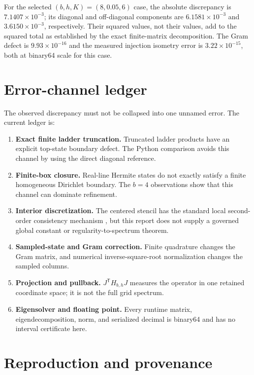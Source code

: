 \documentclass[11pt]{article}
\begin{document}
For the selected $(b,h,K)=(8,0.05,6)$ case, the absolute discrepancy is
$7.1407\times10^{-3}$; its diagonal and off-diagonal components are
$6.1581\times10^{-3}$ and $3.6150\times10^{-3}$, respectively.  Their squared values,
not their values, add to the squared total as established by the exact finite-matrix
decomposition.  The Gram defect is $9.93\times10^{-16}$ and the measured injection
isometry error is $3.22\times10^{-15}$, both at binary64 scale for this case.

\section{Error-channel ledger}

The observed discrepancy must not be collapsed into one unnamed error.  The current
ledger is:
\begin{enumerate}
\item \textbf{Exact finite ladder truncation.} Truncated ladder products have an
explicit top-state boundary defect.  The Python comparison avoids this channel by
using the direct diagonal reference.
\item \textbf{Finite-box closure.} Real-line Hermite states do not exactly satisfy a
finite homogeneous Dirichlet boundary.  The $b=4$ observations show that this channel
can dominate refinement.
\item \textbf{Interior discretization.} The centered stencil has the standard local
second-order consistency mechanism \cite{strikwerda2004}, but this report does not
supply a governed global
constant or regularity-to-spectrum theorem.
\item \textbf{Sampled-state and Gram correction.} Finite quadrature changes the Gram
matrix, and numerical inverse-square-root normalization changes the sampled columns.
\item \textbf{Projection and pullback.} $J^{\mathsf T}H_{b,h}J$ measures the operator
in one retained coordinate space; it is not the full grid spectrum.
\item \textbf{Eigensolver and floating point.} Every runtime matrix, eigendecomposition,
norm, and serialized decimal is binary64 and has no interval certificate here.
\end{enumerate}

\section{Reproduction and provenance}
\end{document}
